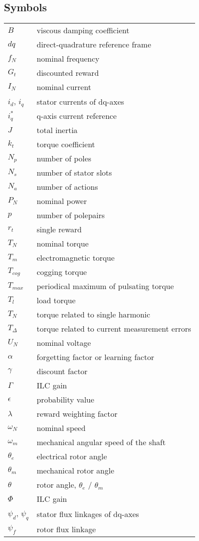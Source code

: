 \documentclass[english, 12pt, a4paper, elec, utf8, a-2b, online]{aaltothesis}
\begin{document}
\subsection*{Symbols}

\begin{tabular}{ll}
$B$           & viscous damping coefficient \\
$dq$          & direct-quadrature reference frame \\
$f_N$         & nominal frequency \\
$G_t$         & discounted reward \\
$I_N$         & nominal current \\
$i_{d}$, $i_{q}$ & stator currents of dq-axes \\
$i^*_{q}$     & q-axis current reference \\
$J$           & total inertia \\
$k_t$         & torque coefficient \\
$N_p$         & number of poles \\
$N_s$         & number of stator slots \\
$N_a$         & number of actions \\
$P_N$         & nominal power \\
$p$           & number of polepairs \\
$r_t$         & single reward \\
$T_N$         & nominal torque \\
$T_m$         & electromagnetic torque \\
$T_{cog}$     & cogging torque \\
$T_{max}$     & periodical maximum of pulsating torque \\
$T_l$         & load torque \\
$T_N$         & torque related to single harmonic \\
$T_\Delta$    & torque related to current measurement errors \\
$U_N$         & nominal voltage \\
$\alpha$      & forgetting factor or learning factor \\
$\gamma$      & discount factor \\
$\Gamma$      & ILC gain \\
$\epsilon$    & probability value \\
$\lambda$     & reward weighting factor \\
$\omega_N$    & nominal speed \\
$\omega_m$    & mechanical angular speed of the shaft \\
$\theta_e$    & electrical rotor angle \\
$\theta_m$    & mechanical rotor angle \\
$\theta$      & rotor angle, $\theta_e$ / $\theta_m$ \\
$\Phi$        & ILC gain \\
$\psi_{d}$, $\psi_{q}$ & stator flux linkages of dq-axes \\
$\psi_f$      & rotor flux linkage \\
\end{tabular}
\end{document}

